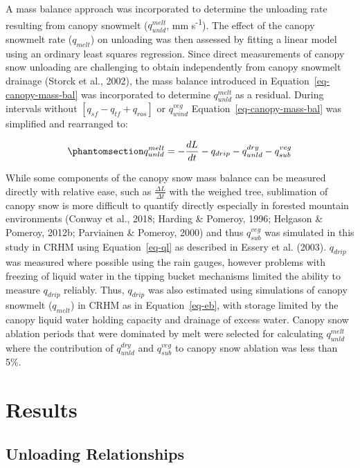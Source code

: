 \documentclass[
]{agujournal2019}
\begin{document}
A mass balance approach was incorporated to determine the unloading rate
resulting from canopy snowmelt (\(q_{unld}^{melt}\), mm
s\textsuperscript{-1}). The effect of the canopy snowmelt rate
(\(q_{melt}\)) on unloading was then assessed by fitting a linear model
using an ordinary least squares regression. Since direct measurements of
canopy snow unloading are challenging to obtain independently from
canopy snowmelt drainage (Storck et al., 2002), the mass balance
introduced in Equation~\ref{eq-canopy-mass-bal} was incorporated to
determine \(q_{unld}^{melt}\) as a residual. During intervals without
\([q_{sf} - q_{tf} + q_{ros}]\) or \(q_{wind}^{veg}\)
Equation~\ref{eq-canopy-mass-bal} was simplified and rearranged to:

\begin{equation}\phantomsection\label{eq-unld-melt-mass-bal}{
q_{unld}^{melt} = -\frac{dL}{dt} - q_{drip} - q_{unld}^{dry} - q_{sub}^{veg}
}\end{equation}

While some components of the canopy snow mass balance can be measured
directly with relative ease, such as \(\frac{\Delta L}{\Delta t}\) with
the weighed tree, sublimation of canopy snow is more difficult to
quantify directly especially in forested mountain environments (Conway
et al., 2018; Harding \& Pomeroy, 1996; Helgason \& Pomeroy, 2012b;
Parviainen \& Pomeroy, 2000) and thus \(q_{sub}^{veg}\) was simulated in
this study in CRHM using Equation~\ref{eq-ql} as described in Essery et
al. (2003). \(q_{drip}\) was measured where possible using the rain
gauges, however problems with freezing of liquid water in the tipping
bucket mechanisms limited the ability to measure \(q_{drip}\) reliably.
Thus, \(q_{drip}\) was also estimated using simulations of canopy
snowmelt (\(q_{melt}\)) in CRHM as in Equation~\ref{eq-eb}, with storage
limited by the canopy liquid water holding capacity and drainage of
excess water. Canopy snow ablation periods that were dominated by melt
were selected for calculating \(q_{unld}^{melt}\) where the contribution
of \(q_{unld}^{dry}\) and \(q_{sub}^{veg}\) to canopy snow ablation was
less than 5\%.

\section{Results}\label{results}

\subsection{Unloading Relationships}\label{sec-unld-rel}
\end{document}
